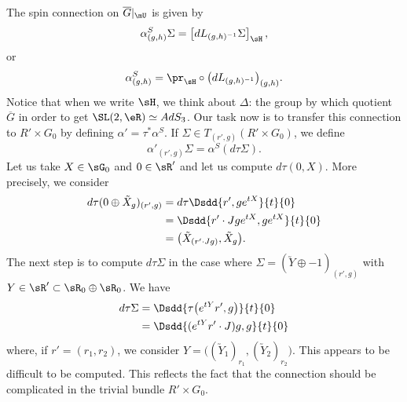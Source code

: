 The spin connection on $\overline{G}|_{\mU}$ is given by
\begin{equation}    \label{EqDefConnAdS3}
  \alpha^{S}_{(g,h)}\Sigma=\left[ dL_{(g,h)^{-1}}\Sigma \right]_{\sH},
\end{equation}
or
\begin{equation}
\alpha^{S}_{(g,h)}=\pr_{\sH}\circ\big( dL_{(g,h)^{-1}} \big)_{(g,h)}.
\end{equation}
Notice that when we write $\sH$, we think about $\Delta$: the group by which quotient  $\overline{G}$ in order to get $\SL(2,\eR)\simeq AdS_3$.
Our task now is to transfer this connection to $R'\times G_0$ by defining $\alpha'=\tau^*\alpha^{S}$. If $\Sigma\in T_{(r',g)}(R'\times G_0)$, we define
\begin{equation}
\alpha'_{(r',g)}\Sigma=\alpha^{S}(d\tau\Sigma).
\end{equation}
Let us take $X\in\sG_0$ and $0\in\sR'$ and let us compute $d\tau(0,X)$. More precisely, we consider
\begin{align*}
d\tau(0\oplus \tilde X_{g})_{(r',g)}&=d\tau\Dsdd{ r',g e^{tX} }{t}{0}\\
        &=\Dsdd{ r'\cdot Jg e^{tX},g e^{tX} }{t}{0}\\
        &=\big( \tilde X_{(r'\cdot Jg)},\tilde X_{g} \big).
\end{align*}
The next step is to compute $d\tau\Sigma$ in the case where $\Sigma=(\utilde Y\oplus -1)_{(r',g)}$ with $Y\in\sR'\subset\sR_{0}\oplus\sR_{0}$. We have
\begin{align}
d\tau\Sigma&=\Dsdd{ \tau\big(  e^{tY}r',g \big) }{t}{0}\\
    &=\Dsdd{ ( e^{tY}r'\cdot J)g,g }{t}{0}
\end{align}
where, if $r'=(r_{1},r_{2})$, we consider $Y=\big((\utilde Y_{1})_{r_{1}},(\utilde Y_{2})_{r_{2}}\big)  $. This appears to be difficult to be computed. This reflects the fact that the connection should be complicated in the trivial bundle $R'\times G_0$.

